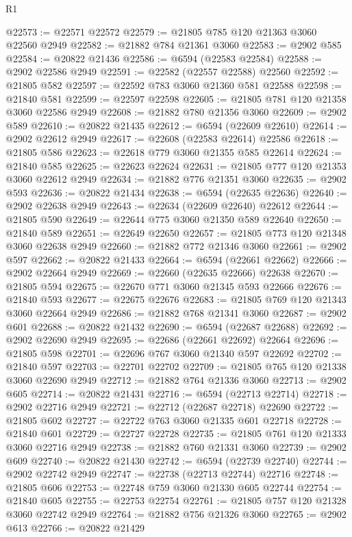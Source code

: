 \begin{lexlean}{R1}
\begin{coremodule}
@22573 := @22571 @22572
@22579 := @21805 @785 @120 @21363 @3060 @22560 @2949
@22582 := @21882 @784 @21361 @3060
@22583 := @2902 @585
@22584 := @20822 @21436
@22586 := @6594 (@22583 @22584)
@22588 := @2902 @22586 @2949
@22591 := @22582 (@22557 @22588) @22560
@22592 := @21805 @582
@22597 := @22592 @783 @3060 @21360 @581 @22588
@22598 := @21840 @581
@22599 := @22597 @22598
@22605 := @21805 @781 @120 @21358 @3060 @22586 @2949
@22608 := @21882 @780 @21356 @3060
@22609 := @2902 @589
@22610 := @20822 @21435
@22612 := @6594 (@22609 @22610)
@22614 := @2902 @22612 @2949
@22617 := @22608 (@22583 @22614) @22586
@22618 := @21805 @586
@22623 := @22618 @779 @3060 @21355 @585 @22614
@22624 := @21840 @585
@22625 := @22623 @22624
@22631 := @21805 @777 @120 @21353 @3060 @22612 @2949
@22634 := @21882 @776 @21351 @3060
@22635 := @2902 @593
@22636 := @20822 @21434
@22638 := @6594 (@22635 @22636)
@22640 := @2902 @22638 @2949
@22643 := @22634 (@22609 @22640) @22612
@22644 := @21805 @590
@22649 := @22644 @775 @3060 @21350 @589 @22640
@22650 := @21840 @589
@22651 := @22649 @22650
@22657 := @21805 @773 @120 @21348 @3060 @22638 @2949
@22660 := @21882 @772 @21346 @3060
@22661 := @2902 @597
@22662 := @20822 @21433
@22664 := @6594 (@22661 @22662)
@22666 := @2902 @22664 @2949
@22669 := @22660 (@22635 @22666) @22638
@22670 := @21805 @594
@22675 := @22670 @771 @3060 @21345 @593 @22666
@22676 := @21840 @593
@22677 := @22675 @22676
@22683 := @21805 @769 @120 @21343 @3060 @22664 @2949
@22686 := @21882 @768 @21341 @3060
@22687 := @2902 @601
@22688 := @20822 @21432
@22690 := @6594 (@22687 @22688)
@22692 := @2902 @22690 @2949
@22695 := @22686 (@22661 @22692) @22664
@22696 := @21805 @598
@22701 := @22696 @767 @3060 @21340 @597 @22692
@22702 := @21840 @597
@22703 := @22701 @22702
@22709 := @21805 @765 @120 @21338 @3060 @22690 @2949
@22712 := @21882 @764 @21336 @3060
@22713 := @2902 @605
@22714 := @20822 @21431
@22716 := @6594 (@22713 @22714)
@22718 := @2902 @22716 @2949
@22721 := @22712 (@22687 @22718) @22690
@22722 := @21805 @602
@22727 := @22722 @763 @3060 @21335 @601 @22718
@22728 := @21840 @601
@22729 := @22727 @22728
@22735 := @21805 @761 @120 @21333 @3060 @22716 @2949
@22738 := @21882 @760 @21331 @3060
@22739 := @2902 @609
@22740 := @20822 @21430
@22742 := @6594 (@22739 @22740)
@22744 := @2902 @22742 @2949
@22747 := @22738 (@22713 @22744) @22716
@22748 := @21805 @606
@22753 := @22748 @759 @3060 @21330 @605 @22744
@22754 := @21840 @605
@22755 := @22753 @22754
@22761 := @21805 @757 @120 @21328 @3060 @22742 @2949
@22764 := @21882 @756 @21326 @3060
@22765 := @2902 @613
@22766 := @20822 @21429

\end{coremodule}
\end{lexlean}
